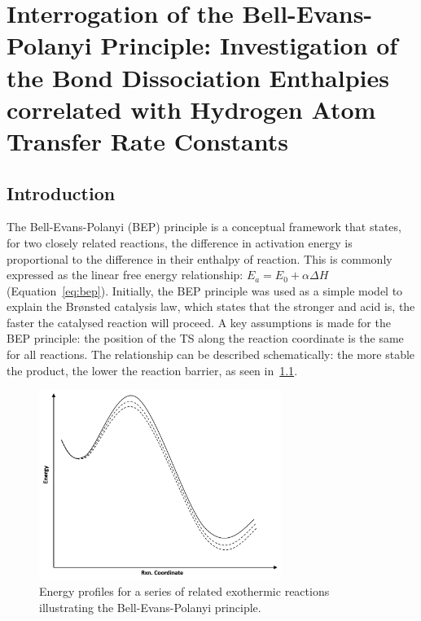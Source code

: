 
\chapter{Interrogation of the Bell-Evans-Polanyi Principle: Investigation of the Bond Dissociation Enthalpies correlated with Hydrogen Atom Transfer Rate Constants}
\label{ch:bde}

\section{Introduction}

The Bell-Evans-Polanyi (BEP) principle is a conceptual framework that states, for two closely related reactions, the difference in activation energy is proportional to the difference in their enthalpy of reaction.\cite{Bell1936,Evans1938,Dill2003} This is commonly expressed as the linear free energy relationship: $E_a = E_0 + \alpha \Delta H$ (Equation~\ref{eq:bep}). Initially, the BEP principle was used as a simple model to explain the Br{\o}nsted catalysis law, which states that the stronger and acid is, the faster the catalysed reaction will proceed.\cite{Bronsted1924} A key assumptions is made for the BEP principle: the position of the TS along the reaction coordinate is the same for all reactions. The relationship can be described schematically: the more stable the product, the lower the reaction barrier, as seen in~\ref{fig:bep}.

\begin{figure}[!ht]
  \centering
  \includegraphics[width=0.7\textwidth]{figures/bep}
  \caption{Energy profiles for a series of related exothermic reactions illustrating the Bell-Evans-Polanyi principle.}
\label{fig:bep}
\end{figure}

